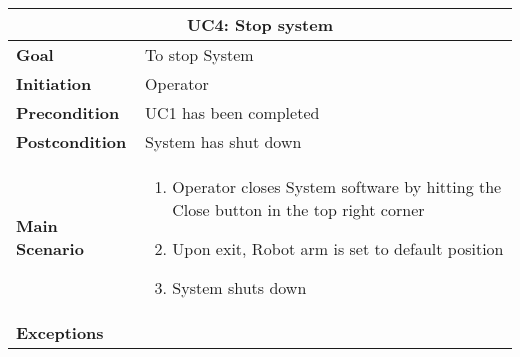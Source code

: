 \documentclass{report}
\begin{document}
\begin{tabular}{ | l | p{} | }
  \hline
  \multicolumn{2}{|c|}{\textbf{UC4: Stop system}} \\ \hline
  \textbf{Goal} & To stop System \\ \hline
  \textbf{Initiation} & Operator \\ \hline
  \textbf{Precondition} & UC1 has been completed \\ \hline
  \textbf{Postcondition} & System has shut down  \\ \hline
  \textbf{Main Scenario} & 
  	{\begin{enumerate} 
  	\item Operator closes System software by hitting the Close button in the top right corner
  	\item Upon exit, Robot arm is set to default position
  	\item System shuts down
  	\end{enumerate}} \\ \hline
  \textbf{Exceptions} & \hspace{1cm} \\ \hline
\end{tabular}
\end{document}
